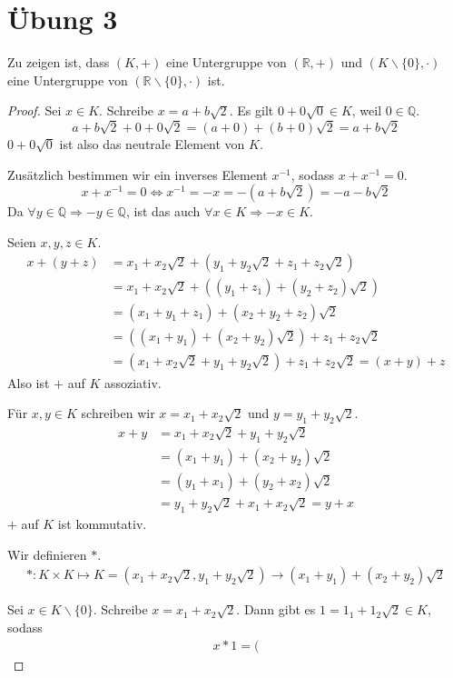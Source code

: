 \documentclass[a4paper,10pt]{article}
\begin{document}
\section*{Übung 3}



Zu zeigen ist, dass $(K, +)$ eine Untergruppe von $(\mathbb{R}, +)$ und $(K\backslash\{0\}, \cdot)$ eine Untergruppe von $(\mathbb{R}\backslash\{0\}, \cdot)$ ist.

\begin{proof}
 Sei $x \in K$.
 Schreibe $x = a + b\sqrt{2}$.
 Es gilt $0 + 0\sqrt{0} \in K$, weil $0 \in \mathbb{Q}$.
 \begin{equation*}
  a + b\sqrt{2} + 0 + 0\sqrt{2} = (a + 0) + (b + 0)\sqrt{2} = a + b\sqrt{2}
 \end{equation*}
 $0 + 0\sqrt{0}$ ist also das neutrale Element von $K$.
 
 Zusätzlich bestimmen wir ein inverses Element $x^{-1}$, sodass $x + x^{-1} = 0$.
 \begin{equation*}
  x + x^{-1} = 0 \Leftrightarrow x^{-1} = -x = -(a + b\sqrt{2}) = -a - b\sqrt{2}
 \end{equation*}
 Da $\forall y \in \mathbb{Q} \Rightarrow -y \in \mathbb{Q}$, ist das auch $\forall x \in K \Rightarrow -x \in K$.
 
 Seien $x, y, z \in K$.
 \begin{align*}
  x + (y + z) & = x_1 + x_2\sqrt{2} + (y_1 + y_2\sqrt{2} + z_1 + z_2\sqrt{2})\\
  & = x_1 + x_2\sqrt{2} + ((y_1 + z_1) + (y_2 + z_2)\sqrt{2})\\
  & = (x_1 + y_1 + z_1) + (x_2 + y_2 + z_2)\sqrt{2}\\
  & = ((x_1 + y_1) + (x_2 + y_2)\sqrt{2}) + z_1 + z_2\sqrt{2}\\
  & = (x_1 + x_2\sqrt{2} + y_1 + y_2\sqrt{2}) + z_1 + z_2\sqrt{2} = (x + y) + z
 \end{align*}
 Also ist $+$ auf $K$ assoziativ.
 
 Für $x, y \in K$ schreiben wir $x = x_1 + x_2\sqrt{2}$ und $y = y_1 + y_2\sqrt{2}$.
 \begin{align*}
  x + y & = x_1 + x_2\sqrt{2} + y_1 + y_2\sqrt{2}\\
  & = (x_1 + y_1) + (x_2 + y_2)\sqrt{2}\\
  & = (y_1 + x_1) + (y_2 + x_2)\sqrt{2}\\
  & = y_1 + y_2\sqrt{2} + x_1 + x_2\sqrt{2} = y + x
 \end{align*}
 $+$ auf $K$ ist kommutativ.
 
 Wir definieren $*$.
 \begin{align*}
  *: K \times K \mapsto K = (x_1 + x_2\sqrt{2}, y_1 + y_2\sqrt{2}) \rightarrow (x_1 + y_1) + (x_2 + y_2)\sqrt{2}
 \end{align*}

 
 Sei $x \in K\backslash\{0\}$.
 Schreibe $x = x_1 + x_2\sqrt{2}$.
 Dann gibt es $1 = 1_1 + 1_2\sqrt{2} \in K$, sodass
 \begin{align*}
  x * 1 = (
 \end{align*}

\end{proof}
\end{document}
